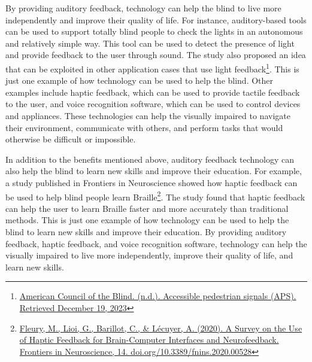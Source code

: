 By providing auditory feedback, technology can help the blind to live more independently and improve their quality of life. For instance, auditory-based tools can be used to support totally blind people to check the lights in an autonomous and relatively simple way\footnotemark[\value{footnote}]. This tool can be used to detect the presence of light and provide feedback to the user through sound. The study also proposed an idea that can be exploited in other application cases that use light feedback\footnote{\raggedright \href{http://https://www.acb.org/content/accessible-pedestrian-signals-aps/}{American Council of the Blind. (n.d.). Accessible pedestrian signals (APS). Retrieved December 19, 2023}}. This is just one example of how technology can be used to help the blind. Other examples include haptic feedback, which can be used to provide tactile feedback to the user, and voice recognition software, which can be used to control devices and appliances. These technologies can help the visually impaired to navigate their environment, communicate with others, and perform tasks that would otherwise be difficult or impossible.

In addition to the benefits mentioned above, auditory feedback technology can also help the blind to learn new skills and improve their education. For example, a study published in Frontiers in Neuroscience showed how haptic feedback can be used to help blind people learn Braille\footnote{\raggedright \href{http://www.frontiersin.org/articles/10.3389/fnins.2020.00528/full}{Fleury, M., Lioi, G., Barillot, C., \& Lécuyer, A. (2020). A Survey on the Use of Haptic Feedback for Brain-Computer Interfaces and Neurofeedback. Frontiers in Neuroscience, 14. doi.org/10.3389/fnins.2020.00528}}. The study found that haptic feedback can help the user to learn Braille faster and more accurately than traditional methods. This is just one example of how technology can be used to help the blind to learn new skills and improve their education. By providing auditory feedback, haptic feedback, and voice recognition software, technology can help the visually impaired to live more independently, improve their quality of life, and learn new skills.

